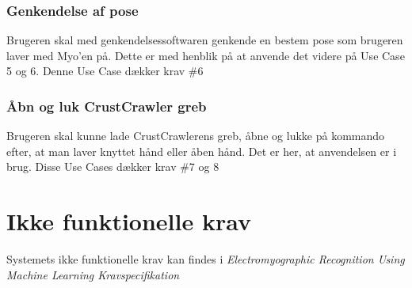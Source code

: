 \subsubsection{Genkendelse af pose}
Brugeren skal med genkendelsessoftwaren genkende en bestem pose som brugeren laver med Myo'en på. Dette er med henblik på at anvende det videre på Use Case 5 og 6. Denne Use Case dækker krav \#6
\subsubsection{Åbn og luk CrustCrawler greb}
Brugeren skal kunne lade CrustCrawlerens greb, åbne og lukke på kommando efter, at man laver knyttet hånd eller åben hånd. Det er her, at anvendelsen er i brug. Disse Use Cases dækker krav \#7 og 8

\section{Ikke funktionelle krav}
\label{sec:ikkefunktionellekrav}
Systemets ikke funktionelle krav kan findes i \textit{Electromyographic Recognition Using Machine Learning Kravspecifikation}\citep{RefWorks:8}